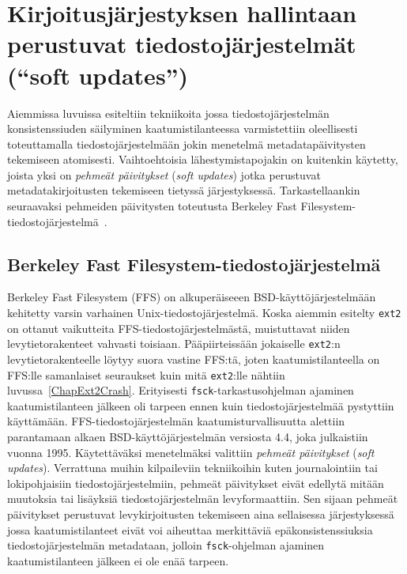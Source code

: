 \section{Kirjoitusjärjestyksen hallintaan perustuvat tiedostojärjestelmät (``soft updates'')}
\label{ChapSoftUpdates}
Aiemmissa luvuissa esiteltiin tekniikoita jossa tiedostojärjestelmän konsistenssiuden säilyminen kaatumistilanteessa varmistettiin oleellisesti toteuttamalla tiedostojärjestelmään jokin menetelmä metadatapäivitysten tekemiseen atomisesti.
Vaihtoehtoisia lähestymistapojakin on kuitenkin käytetty,
joista yksi on \emph{pehmeät päivitykset} (\emph{soft updates}) jotka perustuvat metadatakirjoitusten tekemiseen tietyssä järjestyksessä.
Tarkastellaankin seuraavaksi pehmeiden päivitysten toteutusta Berkeley Fast Filesystem-tiedostojärjestelmä~\cite{SoftUpdatesFfs}.

\subsection{Berkeley Fast Filesystem-tiedostojärjestelmä}
Berkeley Fast Filesystem (FFS) on alkuperäiseeen BSD-käyttöjärjestelmään kehitetty varsin varhainen Unix-tiedostojärjestelmä.
Koska aiemmin esitelty \texttt{ext2} on ottanut vaikutteita FFS-tiedostojärjestelmästä,
muistuttavat niiden levytietorakenteet vahvasti toisiaan.
Pääpiirteissään jokaiselle \texttt{ext2}:n levytietorakenteelle löytyy suora vastine FFS:tä,
joten kaatumistilanteella on FFS:lle samanlaiset seuraukset kuin mitä \texttt{ext2}:lle nähtiin luvussa~\ref{ChapExt2Crash}.
Erityisesti \texttt{fsck}-tarkastusohjelman ajaminen kaatumistilanteen jälkeen oli tarpeen ennen kuin tiedostojärjestelmää pystyttiin käyttämään.
FFS-tiedostojärjestelmän kaatumisturvallisuutta alettiin parantamaan alkaen BSD-käyttöjärjestelmän versiosta 4.4, joka julkaistiin vuonna 1995.
Käytettäväksi menetelmäksi valittiin \emph{pehmeät päivitykset} (\emph{soft updates}).
Verrattuna muihin kilpaileviin tekniikoihin kuten journalointiin tai lokipohjaisiin tiedostojärjestelmiin,
pehmeät päivitykset eivät edellytä mitään muutoksia tai lisäyksiä tiedostojärjestelmän levyformaattiin.
Sen sijaan pehmeät päivitykset perustuvat levykirjoitusten tekemiseen aina sellaisessa järjestyksessä jossa kaatumistilanteet eivät voi aiheuttaa merkittäviä epäkonsistenssiuksia tiedostojärjestelmän metadataan,
jolloin \texttt{fsck}-ohjelman ajaminen kaatumistilanteen jälkeen ei ole enää tarpeen.

